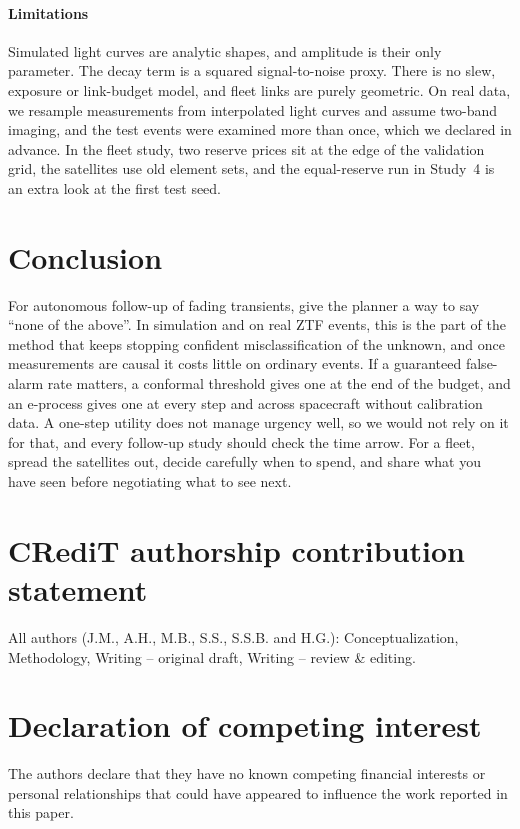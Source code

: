 \documentclass[final,5p,times,twocolumn,authoryear]{elsarticle}
\begin{document}
\paragraph{Limitations} Simulated light curves are analytic shapes, and amplitude is their only parameter. The decay term is a squared signal-to-noise proxy. There is no slew, exposure or link-budget model, and fleet links are purely geometric. On real data, we resample measurements from interpolated light curves and assume two-band imaging, and the test events were examined more than once, which we declared in advance. In the fleet study, two reserve prices sit at the edge of the validation grid, the satellites use old element sets, and the equal-reserve run in Study~4 is an extra look at the first test seed.

\section{Conclusion}\label{sec:concl}
For autonomous follow-up of fading transients, give the planner a way to say ``none of the above''. In simulation and on real ZTF events, this is the part of the method that keeps stopping confident misclassification of the unknown, and once measurements are causal it costs little on ordinary events. If a guaranteed false-alarm rate matters, a conformal threshold gives one at the end of the budget, and an e-process gives one at every step and across spacecraft without calibration data. A one-step utility does not manage urgency well, so we would not rely on it for that, and every follow-up study should check the time arrow. For a fleet, spread the satellites out, decide carefully when to spend, and share what you have seen before negotiating what to see next.

\section*{CRediT authorship contribution statement}
All authors (J.M., A.H., M.B., S.S., S.S.B. and H.G.): Conceptualization, Methodology, Writing -- original draft, Writing -- review \& editing.

\section*{Declaration of competing interest}
The authors declare that they have no known competing financial interests or personal relationships that could have appeared to influence the work reported in this paper.
\end{document}
